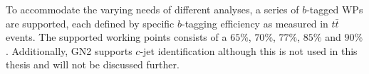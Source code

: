 To accommodate the varying needs of different analyses, a series of $b$-tagged WPs are supported, each defined by specific $b$-tagging efficiency as measured in $t\bar{t}$ events. The supported working points consists of a $65\%$, $70\%$, $77\%$, $85\%$ and $90\%$. Additionally, GN2 supports $c$-jet identification although this is not used in this thesis and will not be discussed further.